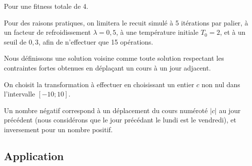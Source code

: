 Pour une fitness totale de 4.

Pour des raisons pratiques, on limitera le recuit simulé à 5 itérations par palier, à un facteur de refroidissement $\lambda = 0,5$, à une température initiale $T_0 = 2$, et à un seuil de $0,3$, afin de n'effectuer que 15 opérations.

Nous définissons une solution voisine comme toute solution respectant les contraintes fortes obtenues en déplaçant un cours à un jour adjacent.

On choisit la transformation à effectuer en choisissant un entier $c$ non nul dans l'intervalle $[-10;10]$.

Un nombre négatif correspond à un déplacement du cours numéroté $|c|$ au jour précédent (nous considérons que le jour précédant le lundi est le vendredi), et inversement pour un nombre positif.

\subsection {Application}


